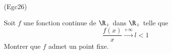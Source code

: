 \begin{tiny}(Egc26)\end{tiny} Soit $f$ une fonction continue de $\R_+$ dans $\R_+$ telle que 
\[
 \frac{f(x)}{x} \xrightarrow{+ \infty} l < 1
\]
Montrer que $f$ admet un point fixe.